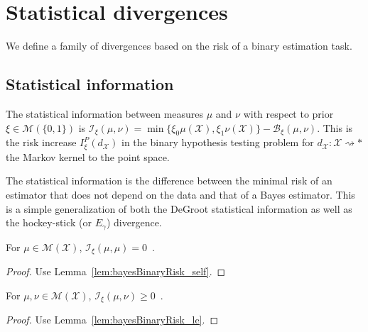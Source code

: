 
\section{Statistical divergences}

We define a family of divergences based on the risk of a binary estimation task.

\subsection{Statistical information}

\begin{definition}
  \label{def:statInfo}
  \leanok
  The statistical information between measures $\mu$ and $\nu$ with respect to prior $\xi \in \mathcal M(\{0,1\})$ is
  $\mathcal I_\xi(\mu, \nu) = \min\{\xi_0 \mu(\mathcal X), \xi_1 \nu(\mathcal X)\} - \mathcal B_\xi(\mu, \nu)$.
  This is the risk increase $I_\xi^P(d_{\mathcal X})$ in the binary hypothesis testing problem for $d_{\mathcal X} : \mathcal X \rightsquigarrow *$ the Markov kernel to the point space.
\end{definition}

The statistical information is the difference between the minimal risk of an estimator that does not depend on the data and that of a Bayes estimator.
This is a simple generalization of both the DeGroot statistical information as well as the hockey-stick (or $E_\gamma$) divergence.

\begin{lemma}
  \label{lem:statInfo_self}
  \leanok
  For $\mu \in \mathcal M(\mathcal X)$, $\mathcal I_\xi(\mu, \mu) = 0$~.
\end{lemma}

\begin{proof}\leanok
{}
Use Lemma~\ref{lem:bayesBinaryRisk_self}.
\end{proof}

\begin{lemma}
  \label{lem:statInfo_nonneg}
  For $\mu, \nu \in \mathcal M(\mathcal X)$, $\mathcal I_\xi(\mu, \nu) \ge 0$~.
\end{lemma}

\begin{proof}%
{}
Use Lemma~\ref{lem:bayesBinaryRisk_le}.
\end{proof}


